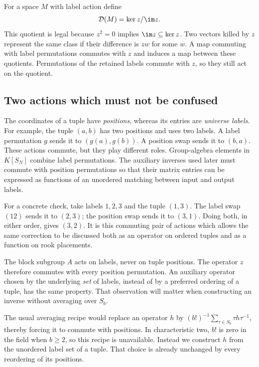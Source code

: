 \documentclass[11pt,a4paper,oneside,openany]{book}
\theoremstyle{definition}\newtheorem{definition}[theorem]{Definition}
\theoremstyle{remark}\newtheorem{remark}[theorem]{Remark}
\newcommand{\D}{\mathcal D}\newcommand{\Del}{\mathcal D}\newcommand{\Lift}{\mathsf L}
\numberwithin{equation}{chapter}
\begin{document}
For a space $M$ with label action define
\begin{equation}\label{tx:eq:D2}\D(M)=\ker z/\im z.\end{equation}
This quotient is legal because $z^2=0$ implies $\im z\subseteq\ker z$. Two vectors killed by $z$ represent the same class if their difference is $zw$ for some $w$. A map commuting with label permutations commutes with $z$ and induces a map between these quotients. Permutations of the retained labels commute with $z$, so they still act on the quotient.

\subsection{Two actions which must not be confused}
The coordinates of a tuple have \emph{positions}, whereas its entries
are \emph{universe labels}. For example, the tuple $(a,b)$ has two
positions and uses two labels. A label permutation $g$ sends it to
$(g(a),g(b))$. A position swap sends it to $(b,a)$. These actions
commute, but they play different roles. Group-algebra elements in
$K[S_N]$ combine label permutations. The auxiliary inverses used later
must commute with position permutations so that their matrix entries
can be expressed as functions of an unordered matching between input
and output labels.

For a concrete check, take labels $1,2,3$ and the tuple $(1,3)$.
The label swap $(12)$ sends it to $(2,3)$; the position swap sends
it to $(3,1)$. Doing both, in either order, gives $(3,2)$. It is
this commuting pair of actions which allows the same correction to
be discussed both as an operator on ordered tuples and as a function
on rook placements.

The block subgroup $A$ acts on labels, never on tuple positions. The
operator $z$ therefore commutes with every position permutation.
An auxiliary operator chosen by the underlying \emph{set} of labels,
instead of by a preferred ordering of a tuple, has the same property.
That observation will matter when constructing an inverse without
averaging over $S_b$.

The usual averaging recipe would replace an operator $h$ by
$(b!)^{-1}\sum_{\tau\in S_b}\tau h\tau^{-1}$, thereby forcing
it to commute with positions. In characteristic two, $b!$ is zero
in the field when $b\ge2$, so this recipe is unavailable. Instead
we construct $h$ from the unordered label set of a tuple. That
choice is already unchanged by every reordering of its positions.
\end{document}

